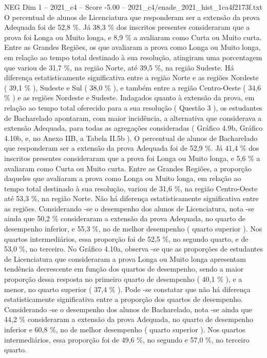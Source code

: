 \begin{textsample}{NEG Dim 1 – 2021\_c4 – Score -5.00 – 2021\_c4/enade\_2021\_hist\_1ca4f2173f.txt}
O percentual de alunos de Licenciatura que responderam ser a extensão da prova Adequada foi de 52,8 \%.
Já 38,3 \% dos inscritos presentes consideraram que a prova foi Longa ou Muito longa, e 8,9 \% a avaliaram como Curta ou Muito curta.
Entre as Grandes Regiões, os que avaliaram a prova como Longa ou Muito longa, em relação ao tempo total destinado à sua resolução, atingiram uma porcentagem que variou de 31,7 \%, na região Norte, até 39,5 \%, na região Sudeste.
Há diferença estatisticamente significativa entre a região Norte e as regiões Nordeste ( 39,1 \% ), Sudeste e Sul ( 38,0 \% ), e também entre a região Centro-Oeste ( 34,6 \% ) e as regiões Nordeste e Sudeste.
Indagados quanto à extensão da prova, em relação ao tempo total oferecido para a sua resolução ( Questão 3 ), os estudantes de Bacharelado apontaram, com maior incidência, a alternativa que considerava a extensão Adequada, para todas as agregações consideradas ( Gráfico 4.9b, Gráfico 4.10b, e, no Anexo IIB, a Tabela II.5b ).
O percentual de alunos de Bacharelado que responderam ser a extensão da prova Adequada foi de 52,9 \%.
Já 41,4 \% dos inscritos presentes consideraram que a prova foi Longa ou Muito longa, e 5,6 \% a avaliaram como Curta ou Muito curta.
Entre as Grandes Regiões, a proporção daqueles que avaliaram a prova como Longa ou Muito longa, em relação ao tempo total destinado à sua resolução, variou de 31,6 \%, na região Centro-Oeste até 53,3 \%, na região Norte.
Não há diferença estatisticamente significativa entre as regiões.
Considerando -se o desempenho dos alunos de Licenciatura, nota -se ainda que 50,2 \% consideraram a extensão da prova Adequada, no quarto de desempenho inferior, e 55,3 \%, no de melhor desempenho ( quarto superior ).
Nos quartos intermediários, essa proporção foi de 52,5 \%, no segundo quarto, e de 53,0 \%, no terceiro.
No Gráfico 4.10a, observa -se que as proporções de estudantes de Licenciatura que consideraram a prova Longa ou Muito longa apresentam tendência decrescente em função dos quartos de desempenho, sendo a maior proporção dessa resposta no primeiro quarto de desempenho ( 40,1 \% ), e a menor, no quarto superior ( 37,4 \% ).
Pode -se constatar que não há diferença estatisticamente significativa entre a proporção dos quartos de desempenho.
Considerando -se o desempenho dos alunos de Bacharelado, nota -se ainda que 44,2 \% consideraram a extensão da prova Adequada, no quarto de desempenho inferior e 60,8 \%, no de melhor desempenho ( quarto superior ).
Nos quartos intermediários, essa proporção foi de 49,6 \%, no segundo e 57,0 \%, no terceiro quarto.

\end{textsample}
